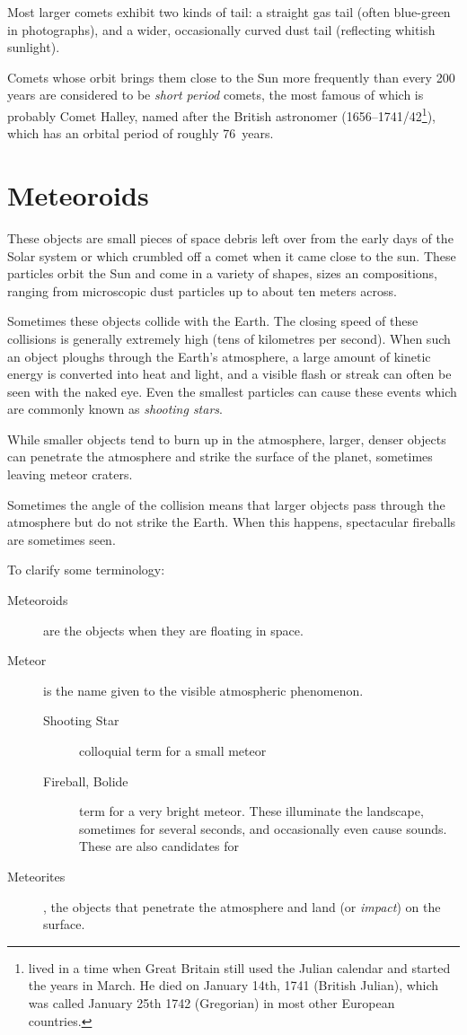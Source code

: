 Most larger comets exhibit two kinds of tail: a straight gas tail
(often blue-green in photographs), and a wider, occasionally curved
dust tail (reflecting whitish sunlight).

Comets whose orbit brings them close to the Sun more frequently than
every 200 years are considered to be \emph{short period} comets, the
most famous of which is probably Comet Halley, named after the British
astronomer  (1656--1741/42\footnote{ lived 
in a time when Great Britain still used the Julian calendar and started 
the years in March. He died on January 14th, 1741 (British Julian), 
which was called January 25th 1742 (Gregorian) in most other European countries.}), 
which has an orbital period of roughly 76~years.


\section{Meteoroids}
\label{sec:Phenomena:Meteoroids}

These objects are small pieces of space debris left over from the early
days of the Solar system or which crumbled off a comet when it came close to the sun. 
These particles orbit the Sun and come in a variety of shapes, 
sizes an compositions, ranging from microscopic dust particles
up to about ten meters across.

Sometimes these objects collide with the Earth. The closing speed of
these collisions is generally extremely high (tens of kilometres per
second). When such an object ploughs through the Earth's atmosphere, a
large amount of kinetic energy is converted into heat and light, and a
visible flash or streak can often be seen with the naked eye. Even the
smallest particles can cause these events which are commonly known as
\emph{shooting stars}.

While smaller objects tend to burn up in the atmosphere, larger, denser
objects can penetrate the atmosphere and strike the surface of the
planet, sometimes leaving meteor craters.

Sometimes the angle of the collision means that larger objects pass
through the atmosphere but do not strike the Earth. When this happens,
spectacular fireballs are sometimes seen.

To clarify some terminology:
\begin{description}
\item[Meteoroids]  are the objects when they are floating in space.
\item[Meteor] is the name given to the visible atmospheric phenomenon.
\begin{description}
 \item[Shooting Star] colloquial term for a small meteor
 \item[Fireball, Bolide] term for a very bright meteor. These illuminate the landscape, 
  sometimes for several seconds, and occasionally even cause sounds. These are also candidates for 
\end{description}
\item[Meteorites], the objects that penetrate the
atmosphere and land (or \emph{impact}) on the surface.
\end{description}

